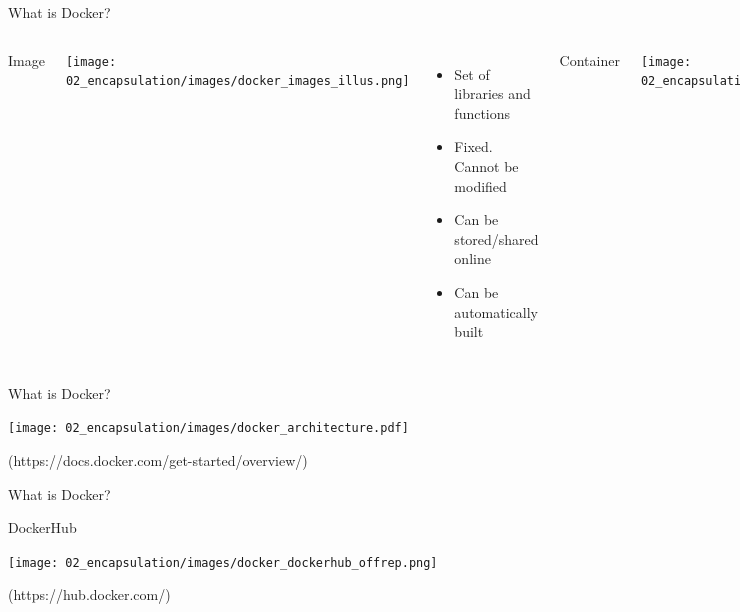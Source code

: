 \begin{frame}{What is Docker?}

\begin{columns}


\centering Image

\centering\texttt{[image: 02\_encapsulation/images/docker\_images\_illus.png]}

\begin{itemize}
  \item Set of libraries and functions
  \item Fixed. Cannot be modified
  \item Can be stored/shared online
  \item Can be automatically built
\end{itemize}


\centering Container

\centering\texttt{[image: 02\_encapsulation/images/docker\_containers\_illus.png]} 

\begin{itemize}
  \item "Active image"
  \item Can be modified (interactive)
  \item Can be turned into an image
  \item One image, many containers
\end{itemize}

\end{columns}

\end{frame}

\begin{frame}{What is Docker?}

\centering\texttt{[image: 02\_encapsulation/images/docker\_architecture.pdf]}

(https://docs.docker.com/get-started/overview/)
\end{frame}

\begin{frame}{What is Docker?}

DockerHub

\centering\texttt{[image: 02\_encapsulation/images/docker\_dockerhub\_offrep.png]}

(https://hub.docker.com/)
\end{frame}

